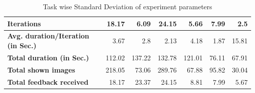 \documentclass[english]{tktltiki}
\begin{document}
\begin{table}
\begin{center}
\begin{tabular}{|l|r|r|r|r|r|r|}
        \multicolumn{1}{|l|}{\textbf{Iterations}} & 18.17 & 6.09 & 24.15 & 5.66 & 7.99 & 2.5 \\
        \hline
        
        \multicolumn{1}{|l|}{\textbf{Avg. duration/Iteration (in Sec.)}} & 3.67 & 2.8 & 2.13 & 4.18 & 1.87 & 15.81 \\
        \hline
        
        \multicolumn{1}{|l|}{\textbf{Total duration (in Sec.)}} & 112.02 & 137.22 & 132.78 & 121.01 & 76.11 & 67.91 \\
        \hline
        
        \multicolumn{1}{|l|}{\textbf{Total shown images}} & 218.05 & 73.06 & 289.76 & 67.88 & 95.82 & 30.04 \\
        \hline
        
        \multicolumn{1}{|l|}{\textbf{Total feedback received}} & 18.17 & 23.37 & 24.15 & 8.81 & 7.99 & 5.67 \\
        \hline

    \end{tabular}
	\end{center}
	\caption{Task wise Standard Deviation of experiment parameters}
    \label{table:exp_std_task}
\end{table}
\fi
\end{document}
